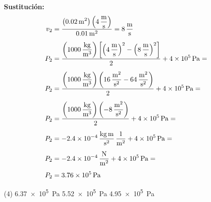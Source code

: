 \documentclass[12pt]{exam}
\begin{document}
\begin{questions}
    \vspace{0.3cm}
    \textbf{Sustitución:}
    \begin{align*}
    v_{2} &= \dfrac{\displaystyle \left( \SI{0.02}{\square\meter} \right) \left( \SI[per-mode=fraction]{4}{\meter\per\second} \right)}{\SI{0.01}{\square\meter}} = \SI[per-mode=fraction]{8}{\meter\per\second} \\[0.5em]
    P_{2} &= \dfrac{\displaystyle \left( \SI[per-mode=fraction]{1000}{\kilo\gram\per\cubic\meter} \right) \left[ \left( \SI[per-mode=fraction]{4}{\meter\per\second} \right)^{2} - \left( \SI[per-mode=fraction]{8}{\meter\per\second} \right)^{2} \right] }{2} + \SI{4d5}{\pascal} = \\[0.5em]
    P_{2} &= \dfrac{\displaystyle \left( \SI[per-mode=fraction]{1000}{\kilo\gram\per\cubic\meter} \right) \left( \SI[per-mode=fraction]{16}{\square\meter\per\square\second} - \SI[per-mode=fraction]{64}{\square\meter\per\square\second} \right) }{2} + \SI{4d5}{\pascal} = \\[0.5em]
    P_{2} &= \dfrac{\displaystyle \left( \SI[per-mode=fraction]{1000}{\kilo\gram\per\cubic\meter} \right) \left( \SI[per-mode=fraction]{-8}{\square\meter\per\square\second} \right) }{2} + \SI{4d5}{\pascal} = \\[0.5em]
    P_{2} &= \SI[per-mode=fraction]{-2.4d-4}{\kilo\gram\meter\per\square\second} \,\unit[per-mode=fraction]{\per\square\meter} + \SI{4d5}{\pascal} = \\[0.5em]
    P_{2} &= \SI[per-mode=fraction]{-2.4d-4}{\newton\per\square\meter} + \SI{4d5}{\pascal} = \\[0.5em]
    P_{2} &= \SI{3.76e5}{\pascal}
    \end{align*}

    \vspace*{0.3cm}
    \begin{tasks}(4)
        \task \SI{6.37e5}{\pascal}
        \task \SI{5.52e5}{\pascal}
        \task \SI{4.95e5}{\pascal}
        \task {}
    \end{tasks}
    


\end{questions}
\end{document}
